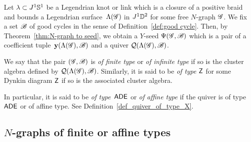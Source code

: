 
Let $\lambda\subset J^1\mathbb{S}^1$ be a Legendrian knot or link which is a closure of a positive braid and bounds a Legendrian surface~$\Lambda(\mathscr{G})$ in $J^1\mathbb{D}^2$ for some free $N$-graph $\mathscr{G}$.
We fix a set $\mathscr{B}$ of good cycles in the sense of Definition~\ref{def:good cycle}.
Then, by Theorem~\ref{thm:N-graph to seed}, we obtain a $Y$-seed $\Psi(\mathscr{G},\mathscr{B})$ which is a pair of a coefficient tuple~$\mathbf{y}(\Lambda(\mathscr{G}),\mathscr{B})$ 
and a quiver $\mathcal{Q}(\Lambda(\mathscr{G}),\mathscr{B})$. 

We say that the pair $(\mathscr{G},\mathscr{B})$ is \emph{of finite type} or \emph{of
infinite type} if so is the cluster algebra defined by
$\mathcal{Q}(\Lambda(\mathscr{G}),\mathscr{B})$.
Similarly, it is said to be \emph{of type $\mathsf{Z}$} for some Dynkin diagram $\mathsf{Z}$ if so is the associated cluster algebra.

In particular, it is said to be \emph{of type~$\mathsf{ADE}$} or \emph{of affine type} if the quiver is of type $\mathsf{ADE}$ or of affine type. See Definition~\ref{def_quiver_of_type_X}.


\subsection{\texorpdfstring{$N$-graphs}{N-graphs} of finite or affine types}

